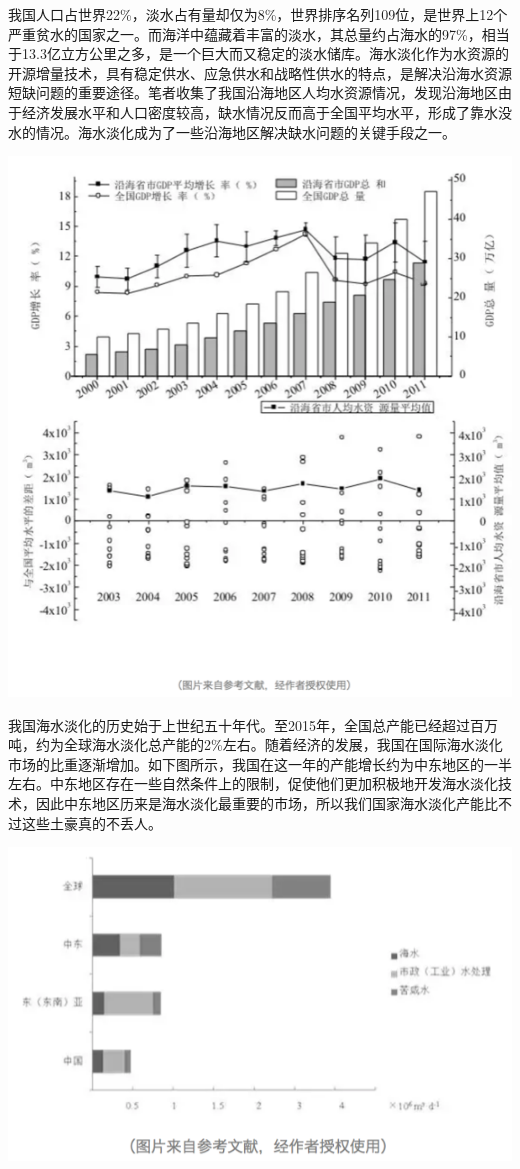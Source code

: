 \documentclass[]{book}
\begin{document}
我国人口占世界22\%，淡水占有量却仅为8\%，世界排序名列109位，是世界上12个严重贫水的国家之一。而海洋中蕴藏着丰富的淡水，其总量约占海水的97\%，相当于13.3亿立方公里之多，是一个巨大而又稳定的淡水储库。海水淡化作为水资源的开源增量技术，具有稳定供水、应急供水和战略性供水的特点，是解决沿海水资源短缺问题的重要途径。笔者收集了我国沿海地区人均水资源情况，发现沿海地区由于经济发展水平和人口密度较高，缺水情况反而高于全国平均水平，形成了靠水没水的情况。海水淡化成为了一些沿海地区解决缺水问题的关键手段之一。

\includegraphics[width=7.76in]{images/seawater3}

我国海水淡化的历史始于上世纪五十年代。至2015年，全国总产能已经超过百万吨，约为全球海水淡化总产能的2\%左右。随着经济的发展，我国在国际海水淡化市场的比重逐渐增加。如下图所示，我国在这一年的产能增长约为中东地区的一半左右。中东地区存在一些自然条件上的限制，促使他们更加积极地开发海水淡化技术，因此中东地区历来是海水淡化最重要的市场，所以我们国家海水淡化产能比不过这些土豪真的不丢人。

\includegraphics[width=8.33in]{images/seawater4}
\end{document}
